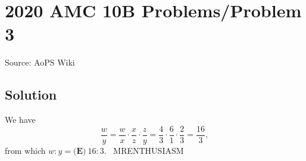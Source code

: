 \documentclass[12pt]{article}
\begin{document}
\section*{{2020 AMC 10B Problems/Problem 3}}
Source: AoPS Wiki

\subsection*{Solution}
We have \[\frac wy = \frac wx \cdot \frac xz \cdot \frac zy = \frac43\cdot\frac61\cdot\frac23=\frac{16}{3},\] from which $w:y=\boxed{\textbf{(E)}\ 16:3}.$ ~MRENTHUSIASM
\end{document}
